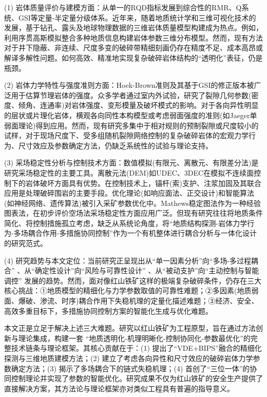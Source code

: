 \documentclass[twocolumn,a4paper,10pt]{article}
\begin{document}
(1) 岩体质量评价与建模方面：从单一的RQD指标发展到综合性的RMR\cite{9}、Q系统\cite{10}、GSI\cite{11}等定量-半定量分级体系。近年来，随着地质统计学\cite{12}和三维可视化技术\cite{13}的发展，基于钻孔、露头及地球物理数据的三维岩体质量模型构建成为热点。例如，利用序贯高斯模拟整合多种地质信息构建岩体参数三维分布模型\cite{14}。然而，现有方法对于井下隐蔽、非连续、尺度多变的破碎带精细刻画仍存在精度不足、成本高昂或解译多解性问题。如何高效、精准地实现复杂破碎岩体结构的“透明化”表征，仍是瓶颈。

(2) 岩体力学特性与强度准则方面：Hoek-Brown准则及其基于GSI的修正版本被广泛用于估算节理岩体的强度\cite{15}。众多学者通过室内外试验，研究了裂隙几何参数(密度、倾角、连通率)对岩体强度、变形模量及破坏模式的影响\cite{16,17}。对于各向异性明显的层状或片理化岩体，横观各向同性本构模型或考虑弱面强度的准则(如Jaeger单弱面理论)得到应用\cite{18}。然而，现有研究多集中于相对规则的预制裂隙或尺度较小的试样，对于现场尺度下、受多组随机裂隙网络控制的复杂破碎岩体的宏观力学行为、尺寸效应及参数确定方法，仍缺乏系统性的试验与理论支持。

(3) 采场稳定性分析与控制技术方面：数值模拟(有限元、离散元、有限差分法)是研究采场稳定性的主要工具\cite{19,20}。离散元法(DEM)如UDEC、3DEC在模拟不连续面控制下的岩体破坏方面具有优势\cite{21}。在控制技术上，锚杆(索)支护、注浆加固及其联合应用是处理破碎围岩的主要手段\cite{22,23}。优化理论(如响应面法、正交设计)和智能算法(如神经网络、遗传算法)被引入采矿参数优化中\cite{24,25}。Mathews稳定图法作为一种经验图表法，在初步评价空场法采场稳定性方面应用广泛\cite{26}。但现有研究往往将地质条件简化、将控制措施孤立考虑，缺乏从系统论角度，将“地质结构探测-岩体力学行为-多场耦合作用-多措施协同控制”作为一个有机整体进行耦合分析与一体化设计的研究范式。

(4) 研究趋势与本文定位：当前研究正呈现出从“单一因素分析”向“多场-多过程耦合” \cite{27}、从“确定性设计”向“风险与可靠性设计” \cite{28}、从“被动支护”向“主动控制与智能调控” \cite{29}发展的趋势。然而，面对像红山铁矿这样的极端复杂破碎条件，仍存在三大核心挑战：①地质模型的精细化与力学参数取值的可靠性难题；②多因素(地质弱面、爆破、渗流、时序)耦合作用下失稳机理的定量化描述难题；③经济、安全、高效多重目标下，多措施协同控制方案的智能化生成与优化难题。

本文正是立足于解决上述三大难题。研究以红山铁矿为工程原型，旨在通过方法创新与理论集成，构建一套 “地质透明化-机理明晰化-控制协同化-参数最优化”的完整技术链条与理论框架。其核心贡献在于：(1) 提出了“VDE+BIPS”融合的精细化探测与三维地质建模方法；(2) 建立了考虑各向异性和尺寸效应的破碎岩体力学参数确定方法；(3) 揭示了多场耦合下的链式失稳机理；(4) 首创了“三位一体”的协同控制理论并实现了参数的智能优化。研究成果不仅为红山铁矿的安全生产提供了直接解决方案，其方法论与理论框架亦对类似工程具有普遍的指导意义。
\end{document}
